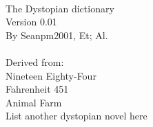 \documentclass{article} %
\title{\TheDystopianDictionary} %
\begin{document}
  \maketitle
  \TheDystopianDictionary
  \makeIndex
  \Title{} \\
  The Dystopian dictionary \\
  Version 0.01 \\
  By Seanpm2001, Et; Al. \\
  \\
  Derived from: \\
  Nineteen Eighty-Four \\
  Fahrenheit 451 \\
  Animal Farm \\
  List another dystopian novel here \\
  \\
  \\
  \\
  \\
\end{document}
